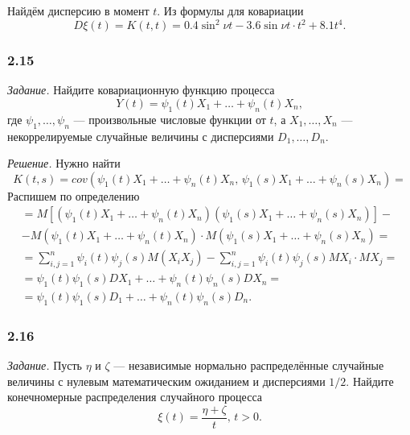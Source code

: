 Найдём дисперсию в момент $t$.
Из формулы для ковариации
$$D \xi \left( t \right) =
  K \left( t, t \right) =
  0.4 \sin^2 \nu t - 3.6 \sin \nu t \cdot t^2 + 8.1t^4.$$

\subsubsection*{2.15}

\textit{Задание.}
Найдите ковариационную функцию процесса
$$Y \left( t \right) =
  \psi_1 \left( t \right) X_1 + \dotsc + \psi_n \left( t \right) X_n,$$
где $ \psi_1, \dotsc, \psi_n$ --- произвольные числовые функции от $t$, а $X_1, \dotsc, X_n$ ---
некоррелируемые случайные величины с дисперсиями $D_1, \dotsc, D_n$.

\textit{Решение.}
Нужно найти
$$K \left( t, s \right) =
  cov \left( \psi_1 \left( t \right) X_1 + \dotsc + \psi_n \left( t \right) X_n, \,
    \psi_1 \left( s \right) X_1 + \dotsc + \psi_n \left( s \right) X_n \right) =$$
Распишем по определению
\begin{equation*}
  \begin{split}
    = M \left[
      \left( \psi_1 \left( t \right) X_1 + \dotsc + \psi_n \left( t \right) X_n \right)
      \left( \psi_1 \left( s \right) X_1 + \dotsc + \psi_n \left( s \right) X_n \right) \right] - \\
    - M \left( \psi_1 \left( t \right) X_1 + \dotsc + \psi_n \left( t \right) X_n \right) \cdot
    M \left( \psi_1 \left( s \right) X_1 + \dotsc + \psi_n \left( s \right) X_n \right) = \\
    = \sum \limits_{i, j = 1}^n
      \psi_i \left( t \right) \psi_j \left( s \right) M \left( X_i X_j \right) -
    \sum \limits_{i, j = 1}^n \psi_i \left( t \right) \psi_j \left( s \right) MX_i \cdot MX_j = \\
    = \psi_1 \left( t \right) \psi_1 \left( s \right) DX_1 + \dotsc +
    \psi_n \left( t \right) \psi_n \left( s \right) DX_n= \\
    = \psi_1 \left( t \right) \psi_1 \left( s \right) D_1 + \dotsc +
    \psi_n \left( t \right) \psi_n \left( s \right) D_n.
  \end{split}
\end{equation*}

\subsubsection*{2.16}

\textit{Задание.}
Пусть $ \eta $ и $ \zeta $ --- независимые нормально распределённые
случайные величины с нулевым математическим ожиданием и дисперсиями $1 / 2$.
Найдите конечномерные распределения случайного процесса
$$ \xi \left( t \right) =
  \frac{ \eta + \zeta }{t}, \,
  t > 0.$$

